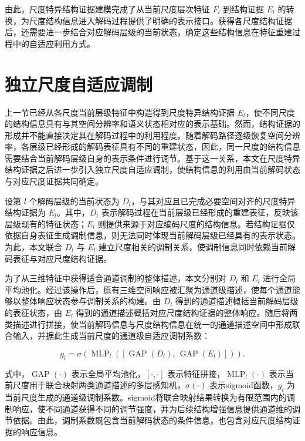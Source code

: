 由此，尺度特异结构证据建模完成了从当前尺度层次特征 \(F_l\) 到结构证据 \(E_l\) 的转换，为尺度结构信息进入解码过程提供了明确的表示接口。获得各尺度结构证据后，还需要进一步结合对应解码层级的当前状态，确定这些结构信息在特征重建过程中的自适应利用方式。

\section{独立尺度自适应调制}

上一节已经从各尺度当前层级特征中构造得到尺度特异结构证据 \(E_l\)，使不同尺度的结构信息具有与其空间分辨率和语义状态相对应的表示基础。然而，结构证据的形成并不能直接决定其在解码过程中的利用程度。随着解码路径逐级恢复空间分辨率，各层级已经形成的解码表征具有不同的重建状态，因此，同一尺度的结构信息需要结合当前解码层级自身的表示条件进行调节。基于这一关系，本文在尺度特异结构证据之后进一步引入独立尺度自适应调制，使结构信息的利用由当前解码状态与对应尺度证据共同确定。

设第 \(l\) 个解码层级的当前状态为 \(D_l\)，与其对应且已完成必要空间对齐的尺度特异结构证据为 \(E_l\)。其中，\(D_l\) 表示解码过程在当前层级已经形成的重建表征，反映该层级现有的特征状态；\(E_l\) 则提供来源于对应编码尺度的结构信息。若结构证据仅依据自身表征生成调制信息，则无法同时体现当前解码层级已经具有的表示状态。为此，本文联合 \(D_l\) 与 \(E_l\) 建立尺度相关的调制关系，使调制信息同时依赖当前解码表征与对应尺度结构证据。

为了从三维特征中获得适合通道调制的整体描述，本文分别对 \(D_l\) 和 \(E_l\) 进行全局平均池化。经过该操作后，原有三维空间响应被汇聚为通道级描述，使每个通道能够以整体响应状态参与调制关系的构建。由 \(D_l\) 得到的通道描述概括当前解码层级的表征状态，由 \(E_l\) 得到的通道描述概括对应尺度结构证据的整体响应。随后将两类描述进行拼接，使当前解码信息与尺度结构信息在统一的通道描述空间中形成联合输入，并据此生成当前尺度的通道级自适应调制系数：

\begin{equation}
\label{eq:ch4-independent-scale-modulation}
g_l=\sigma\!\left(
\operatorname{MLP}_l\!\left(
\left[
\operatorname{GAP}(D_l),\,
\operatorname{GAP}(E_l)
\right]
\right)
\right).
\end{equation}

式中，\(\operatorname{GAP}(\cdot)\) 表示全局平均池化，\([\cdot,\cdot]\) 表示特征拼接，\(\operatorname{MLP}_l(\cdot)\) 表示当前尺度用于联合映射两类通道描述的多层感知机，\(\sigma(\cdot)\) 表示sigmoid函数，\(g_l\) 为当前尺度生成的通道级调制系数。sigmoid将联合映射结果转换为有限范围内的调制响应，使不同通道获得不同的调节强度，并为后续结构增强信息提供通道维的调节依据。由此，调制系数既包含当前解码状态的条件信息，也包含对应尺度结构证据的响应信息。

